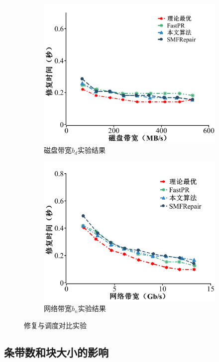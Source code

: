 \begin{figure}[htbp]
\begin{subfigure}[t]{0.4\textwidth}
		\includegraphics[width=1.1\linewidth]{figures/3-10.pdf}
		\caption{磁盘带宽$b_d$实验结果}
		\label{fig:3-10}
	\end{subfigure}
	\begin{subfigure}[t]{0.4\textwidth}
		\centering
		\includegraphics[width=1.1\linewidth]{figures/3-11.pdf}
		\caption{网络带宽$b_n$实验结果}
		\label{fig:3-11}
	\end{subfigure}
	\caption{修复与调度对比实验}
	\label{fig:3-8-11}
\end{figure}


\subsection{条带数和块大小的影响}


